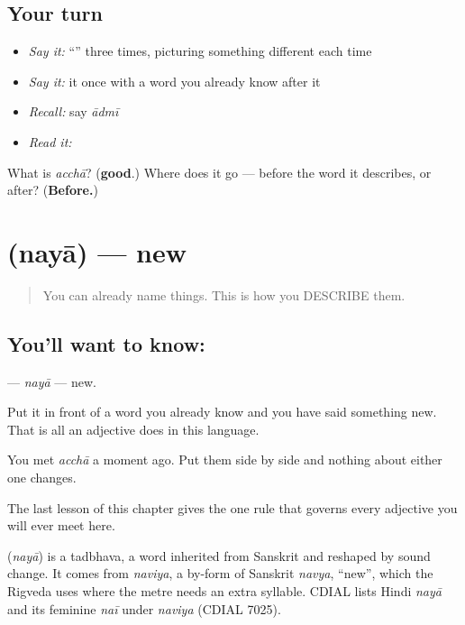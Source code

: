 \subsection*{Your turn}
\begin{itemize}
\raggedright
  \item \emph{Say it:} \textquotedblleft{}\textquotedblright{} three times, picturing something different each time
  \item \emph{Say it:} it once with a word you already know after it
  \item \emph{Recall:} say \emph{ādmī}
  \item \emph{Read it:} \textbf{}
\end{itemize}

\begin{tcolorbox}[breakable,colback=teal!4,colframe=teal!35!black,title={Before you move on}]
What is \emph{acchā}? (\textbf{good}.) Where does it go — before the word it describes, or after? (\textbf{Before.})
\end{tcolorbox}
\section[\texorpdfstring{\hi{नया} (nayā)}{नया (nayā)}]{ (nayā) — new}

\label{lesson:HI-C41-new}



\begin{quote}
You can already name things. This is how you DESCRIBE them.
\end{quote}

\subsection*{You'll want to know: }
\textbf{} — \emph{nayā} — new.

Put it in front of a word you already know and you have said something new. That is all an adjective does in this language.

You met \textbf{} \emph{acchā} a moment ago. Put them side by side and nothing about either one changes.

The last lesson of this chapter gives the one rule that governs every adjective you will ever meet here.

\begin{cousinweb}
\textbf{} (\emph{nayā}) is a tadbhava, a word inherited from Sanskrit and reshaped by sound change. It comes from \emph{naviya}, a by-form of Sanskrit \emph{navya}, \textquotedblleft{}new\textquotedblright{}, which the Rigveda uses where the metre needs an extra syllable. CDIAL lists Hindi \emph{nayā} and its feminine \emph{naī} under \emph{naviya} (CDIAL 7025).
\end{cousinweb}

